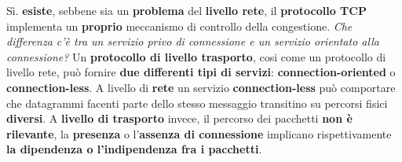 \documentclass[11pt,a4paper]{article}
\theoremstyle{definition}
\begin{document}
Sì. \textbf{esiste}, sebbene sia un \textbf{problema} del \textbf{livello rete}, il \textbf{protocollo TCP} implementa un \textbf{proprio} meccanismo di controllo della congestione.
\newpage
\textit{Che differenza c'è tra un servizio privo di connessione e un servizio orientato alla connessione?}\newline\newline
Un \textbf{protocollo di livello trasporto}, cosi come un protocollo di livello rete, può fornire \textbf{due differenti tipi di servizi}: \textbf{connection-oriented} o \textbf{connection-less}. A livello di \textbf{rete} un servizio \textbf{connection-less} può comportare che datagrammi facenti parte dello stesso messaggio transitino su percorsi fisici \textbf{diversi}. A \textbf{livello di trasporto} invece, il percorso dei pacchetti \textbf{non è rilevante}, la \textbf{presenza} o l'\textbf{assenza di connessione} implicano rispettivamente \textbf{la dipendenza o l'indipendenza fra i pacchetti}.
\end{document}

